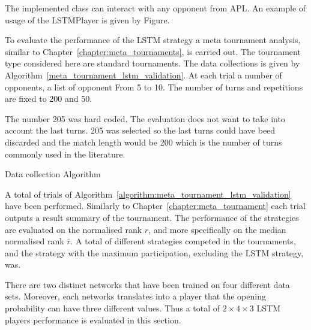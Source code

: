 The implemented class can interact with any opponent from APL.
An example of usage of the LSTMPlayer is given by Figure.

To evaluate the performance of the LSTM strategy a meta tournament analysis,
similar to Chapter~\ref{chapter:meta_tournaments}, is carried out. The
tournament type considered here are standard tournaments. The data collections
is given by Algorithm~\ref{meta_tournament_lstm_validation}. At each trial
a number of opponents, a list of opponent From 5 to 10. The number of turns and repetitions
are fixed to 200 and 50.

The number 205 was hard coded. The evaluation does not want to take into account
the last turns. 205 was selected so the last turns could have beed discarded
and the match length would be 200 which is the number of turns commonly used
in the literature.


\begin{algorithm}[!htbp]
    \;
    \caption{Data collection Algorithm}
    \label{algorithm:meta_tournament_lstm_validation}
\end{algorithm}

A total of \metatournamentslstm trials of
Algorithm~\ref{algorithm:meta_tournament_lstm_validation} have been performed.
Similarly to Chapter~\ref{chapter:meta_tournament} each trial outputs a result
summary of the tournament. The performance of the strategies are evaluated on
the normalised rank \(r\), and more specifically on the median normalised rank
\(\bar{r}\). A total of different strategies competed in the tournaments, and
the strategy with the maximum participation, excluding the LSTM strategy, was.

There are two distinct networks that have been trained on four different data
sets. Moreover, each networks translates into a player that the opening
probability can have three different values. Thus a total of $2 \times 4 \times
3$ LSTM players performance is evaluated in this section.

